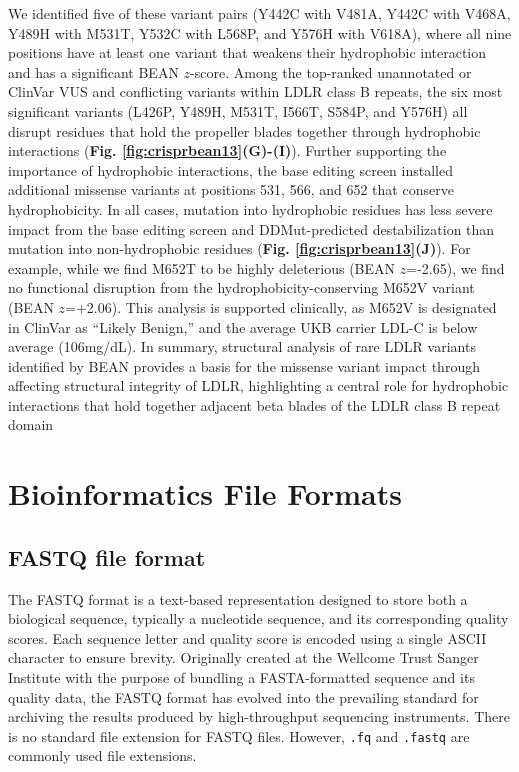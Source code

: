 \documentclass[a4paper, titlepage, openright]{book}
\begin{document}
We identified five of these variant pairs (Y442C with V481A, Y442C with V468A, Y489H with M531T, Y532C with L568P, and Y576H with V618A), where all nine positions have at least one variant that weakens their hydrophobic interaction and has a significant BEAN $z$-score. Among the top-ranked unannotated or ClinVar VUS and conflicting variants within LDLR class B repeats, the six most significant variants (L426P, Y489H, M531T, I566T, S584P, and Y576H) all disrupt residues that hold the propeller blades together through hydrophobic interactions (\textbf{Fig. \ref{fig:crisprbean13}(G)-(I)}). Further supporting the importance of hydrophobic interactions, the base editing screen installed additional missense variants at positions 531, 566, and 652 that conserve hydrophobicity. In all cases, mutation into hydrophobic residues has less severe impact from the base editing screen and DDMut-predicted destabilization than mutation into non-hydrophobic residues (\textbf{Fig. \ref{fig:crisprbean13}(J)}). For example, while we find M652T to be highly deleterious (BEAN $z$=-2.65), we find no functional disruption from the hydrophobicity-conserving M652V variant (BEAN $z$=+2.06). This analysis is supported clinically, as M652V is designated in ClinVar as “Likely Benign,” and the average UKB carrier LDL-C is below average (106mg/dL). In summary, structural analysis of rare LDLR variants identified by BEAN provides a basis for the missense variant impact through affecting structural integrity of LDLR, highlighting a central role for hydrophobic interactions that hold together adjacent beta blades of the LDLR class B repeat domain


\appendix
\chapter{Bioinformatics File Formats}\label{appendix:fileformats}

\section{FASTQ file format}\label{section:fastq-format}
The FASTQ format is a text-based representation designed to store both a biological sequence, typically a nucleotide sequence, and its corresponding quality scores. Each sequence letter and quality score is encoded using a single ASCII character to ensure brevity. Originally created at the Wellcome Trust Sanger Institute with the purpose of bundling a FASTA-formatted sequence and its quality data, the FASTQ format has evolved into the prevailing standard for archiving the results produced by high-throughput sequencing instruments. There is no standard file extension for FASTQ files. However, \texttt{.fq} and \texttt{.fastq} are commonly used file extensions.
\end{document}
